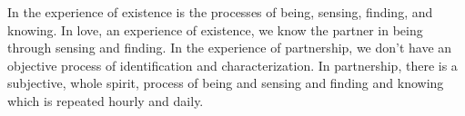 

﻿In the experience of existence is the processes of being, sensing,
finding, and knowing.  In love, an experience of existence, we know
the partner in being through sensing and finding.  In the experience
of partnership, we don’t have an objective process of identification
and characterization.  In partnership, there is a subjective, whole
spirit, process of being and sensing and finding and knowing which is
repeated hourly and daily.

\bye
